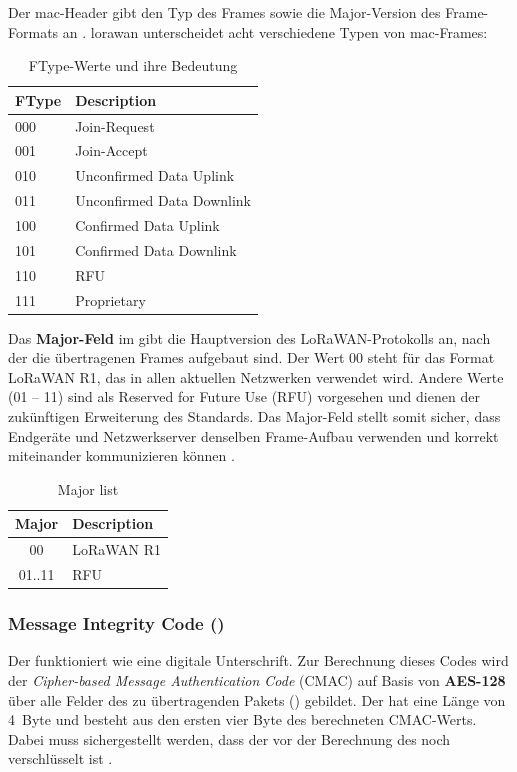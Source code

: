 	Der \ac{mac}-Header gibt den Typ des Frames sowie die Major-Version des Frame-Formats an \cite[15]{LoRaAlliance:2020b}. \ac{lorawan} unterscheidet acht verschiedene Typen von \ac{mac}-Frames:
	\begin{table}[H]
		\centering
		\begin{tabular}{|p{2cm}|p{3cm}|}
			\hline
			\textbf{FType} & \textbf{Description} \\ \hline
			000 & Join-Request \\ \hline
			001 & Join-Accept \\ \hline
			010 & Unconfirmed Data Uplink \\ \hline
			011 & Unconfirmed Data Downlink \\ \hline
			100 & Confirmed Data Uplink \\ \hline
			101 & Confirmed Data Downlink \\ \hline
			110 & RFU \\ \hline
			111 & Proprietary \\ \hline
		\end{tabular}
		\caption{FType-Werte und ihre Bedeutung \cite{LoRaAlliance:2020b}}
	\end{table}
	

	Das \textbf{Major-Feld} im  gibt die Hauptversion des LoRaWAN-Protokolls an, nach der die übertragenen Frames aufgebaut sind. Der Wert 00 steht für das Format LoRaWAN R1, das in allen aktuellen Netzwerken verwendet wird. Andere Werte (01 – 11) sind als Reserved for Future Use (RFU) vorgesehen und dienen der zukünftigen Erweiterung des Standards. Das Major-Feld stellt somit sicher, dass Endgeräte und Netzwerkserver denselben Frame-Aufbau verwenden und korrekt miteinander kommunizieren können \cite{LoRaAlliance:2020b}.
	\begin{table}[H]
		\centering
		\begin{tabular}{|c|l|}
			\hline
			\textbf{Major} & \textbf{Description} \\ \hline
			00 & LoRaWAN R1 \\ \hline
			01..11 & RFU \\ \hline
		\end{tabular}
		\caption{Major list \cite{LoRaAlliance:2020b}}
	\end{table}

\subsubsection{Message Integrity Code () \label{lorawan:mic}}  
	Der  funktioniert wie eine digitale Unterschrift. Zur Berechnung dieses Codes wird der \textit{Cipher-based Message Authentication Code} (CMAC) auf Basis von \textbf{AES-128} über alle Felder des zu übertragenden Pakets () gebildet. Der  hat eine Länge von 4~Byte und besteht aus den ersten vier Byte des berechneten CMAC-Werts. Dabei muss sichergestellt werden, dass der \hyperref[lorawan:frmpayload]{} vor der Berechnung des  noch verschlüsselt ist \cite[24]{LoRaAlliance:2020b}.
	
